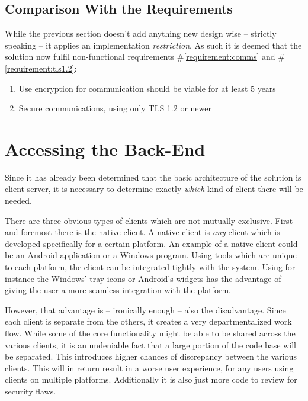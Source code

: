 		\subsection{Comparison With the Requirements}
			\label{requirement:fulfilled:comms}
			\label{requirement:fulfilled:tls1.2}
			While the previous section doesn't add anything new design wise -- strictly speaking -- it applies an implementation \emph{restriction}. As such it is deemed that the solution now fulfil non-functional requirements \#\ref{requirement:comms} and \#\ref{requirement:tls1.2}:
			\vspace{-3ex}\begin{enumerate}
				\setlength\itemsep{0.1em}
				\setcounter{enumi}{5-1}
				\item Use encryption for communication should be viable for at least 5 years
				\item Secure communications, using only TLS 1.2 or newer 
			\end{enumerate}

	\section{Accessing the Back-End}
		\label{sec:design:frontend}
		Since it has already been determined that the basic architecture of the solution is client-server, it is necessary to determine exactly \emph{which} kind of client there will be needed. 

		There are three obvious types of clients which are not mutually exclusive. First and foremost there is the native client. A native client is \emph{any} client which is developed specifically for a certain platform. An example of a native client could be an Android application or a Windows program. Using tools which are unique to each platform, the client can be integrated tightly with the system. Using for instance the Windows' tray icons or Android's widgets has the advantage of giving the user a more seamless integration with the platform. 

		However, that advantage is -- ironically enough -- also the disadvantage. Since each client is separate from the others, it creates a very departmentalized work flow. While some of the core functionality might be able to be shared across the various clients, it is an undeniable fact that a large portion of the code base will be separated. This introduces higher chances of discrepancy between the various clients. This will in return result in a worse user experience, for any users using clients on multiple platforms. Additionally it is also just more code to review for security flaws.

